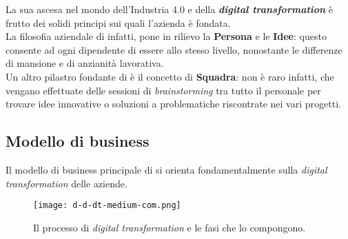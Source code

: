 La sua ascesa nel mondo dell'Industria 4.0 e della \textbf{\textit{digital transformation}} è frutto dei solidi principi sui quali l'azienda è fondata.\\
La filosofia aziendale di \AD{} infatti, pone in rilievo la \textbf{Persona} e le \textbf{Idee}: questo consente ad ogni dipendente di essere allo stesso livello, nonostante le differenze di mansione e di anzianità lavorativa.\\
Un altro pilastro fondante di \AD{} è il concetto di \textbf{Squadra}: non è raro infatti, che vengano effettuate delle sessioni di \textit{brainstorming} tra tutto il personale per trovare idee innovative o soluzioni a problematiche riscontrate nei vari progetti.\\

\subsection{Modello di business}
Il modello di business principale di \AD{} si orienta fondamentalmente sulla \textit{digital transformation} delle aziende.\\

\begin{figure}[h]
\texttt{[image: d-d-dt-medium-com.png]}
\centering
\caption{Il processo di \textit{digital transformation} e le fasi che lo compongono.} 
\label{fig:digital-transformation}
\end{figure}

